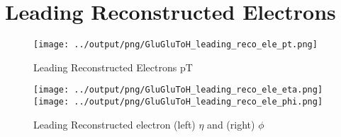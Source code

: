 \documentclass[11pt]{book}
\begin{document}
\clearpage


\section{Leading Reconstructed Electrons}

\begin{figure}[ht]
\centering
\texttt{[image: ../output/png/GluGluToH\_leading\_reco\_ele\_pt.png]}
\caption{Leading Reconstructed Electrons pT}
\label{fig:gluglu_leading_reco_ele_pt}
\end{figure}

\begin{figure}[ht]
\centering
\texttt{[image: ../output/png/GluGluToH\_leading\_reco\_ele\_eta.png]}
\texttt{[image: ../output/png/GluGluToH\_leading\_reco\_ele\_phi.png]}
\caption{Leading Reconstructed electron (left) $\eta$ and (right) $\phi$}
\label{fig:gluglu_leading_reco_ele_eta_phi}
\end{figure}


 
\end{document}
